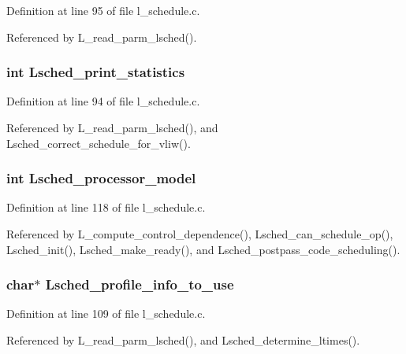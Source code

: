 Definition at line 95 of file l\_\-schedule.c.

Referenced by L\_\-read\_\-parm\_\-lsched().
\subsubsection{\setlength{\rightskip}{0pt plus 5cm}int \bf{Lsched\_\-print\_\-statistics}}\label{l__schedule_8h_e677cd429292523a696a32d17cc7e389}




Definition at line 94 of file l\_\-schedule.c.

Referenced by L\_\-read\_\-parm\_\-lsched(), and Lsched\_\-correct\_\-schedule\_\-for\_\-vliw().
\subsubsection{\setlength{\rightskip}{0pt plus 5cm}int \bf{Lsched\_\-processor\_\-model}}\label{l__schedule_8h_4d59bf1a4de63a2857de2b9f53abd7b2}




Definition at line 118 of file l\_\-schedule.c.

Referenced by L\_\-compute\_\-control\_\-dependence(), Lsched\_\-can\_\-schedule\_\-op(), Lsched\_\-init(), Lsched\_\-make\_\-ready(), and Lsched\_\-postpass\_\-code\_\-scheduling().
\subsubsection{\setlength{\rightskip}{0pt plus 5cm}char$\ast$ \bf{Lsched\_\-profile\_\-info\_\-to\_\-use}}\label{l__schedule_8h_11161fe0b364a73fa794db32524bd926}




Definition at line 109 of file l\_\-schedule.c.

Referenced by L\_\-read\_\-parm\_\-lsched(), and Lsched\_\-determine\_\-ltimes().

